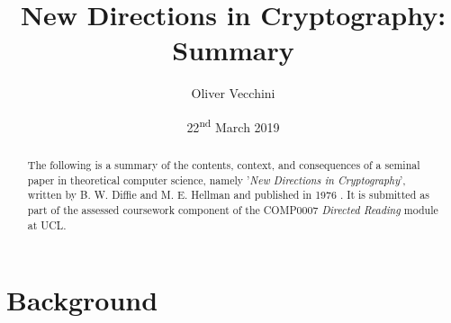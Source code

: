 \documentclass[11pt]{article}
\begin{document}
\title{New Directions in Cryptography: Summary}
\author{Oliver Vecchini} 
\date{22\textsuperscript{nd} March 2019}

\maketitle


\begin{abstract}

        The following is a summary of the contents, context, and consequences
        of a seminal paper in theoretical computer science, namely '\textit{New
        Directions in Cryptography}', written by B. W. Diffie and M. E. Hellman
        and published in 1976 \cite{diffie1976new}. It is submitted as part of
        the assessed coursework component of the COMP0007 \textit{Directed
        Reading} module at UCL.

\end{abstract}



\section{Background}
\end{document}
